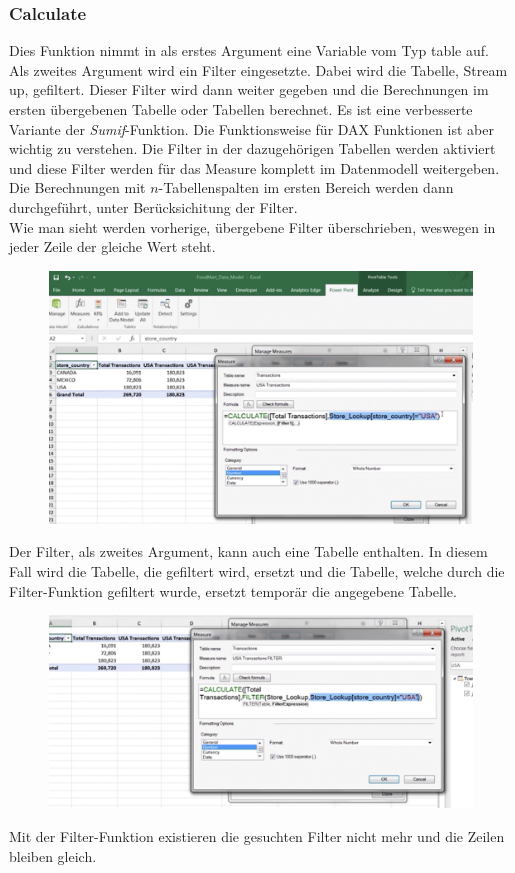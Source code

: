 \subsubsection{Calculate} 
Dies Funktion nimmt in als erstes Argument eine Variable vom Typ table auf. Als zweites Argument wird ein Filter eingesetzte. Dabei wird die Tabelle, Stream up, gefiltert. Dieser Filter wird dann weiter gegeben und die Berechnungen im ersten übergebenen Tabelle oder Tabellen berechnet. Es ist eine verbesserte Variante der \textit{Sumif}-Funktion. Die Funktionsweise für \gls{DAX} Funktionen ist aber wichtig zu verstehen. Die Filter in der dazugehörigen Tabellen werden aktiviert und diese Filter werden für das Measure komplett im Datenmodell weitergeben. Die Berechnungen mit $n$-Tabellenspalten im ersten Bereich werden dann durchgeführt, unter Berücksichitung der Filter. \\
Wie man sieht werden vorherige, übergebene Filter überschrieben, weswegen in jeder Zeile der gleiche Wert steht.
\begin{figure}[H]
	\centering
	\includegraphics[scale = 0.3]{attachment/chapter_1/screenshot097}
	\caption{}
	\label{fig:screenshot097}
\end{figure} 


Der Filter, als zweites Argument, kann auch eine Tabelle enthalten. 
In diesem Fall wird die Tabelle, die gefiltert wird, ersetzt und die Tabelle, welche durch die Filter-Funktion gefiltert wurde, ersetzt temporär die angegebene Tabelle. 
\begin{figure}[H]
	\centering
	\includegraphics[scale = 0.3]{attachment/chapter_1/screenshot098}
	\caption{}
	\label{fig:screenshot098}
\end{figure} 
Mit der Filter-Funktion existieren die gesuchten Filter nicht mehr und die Zeilen bleiben gleich.

